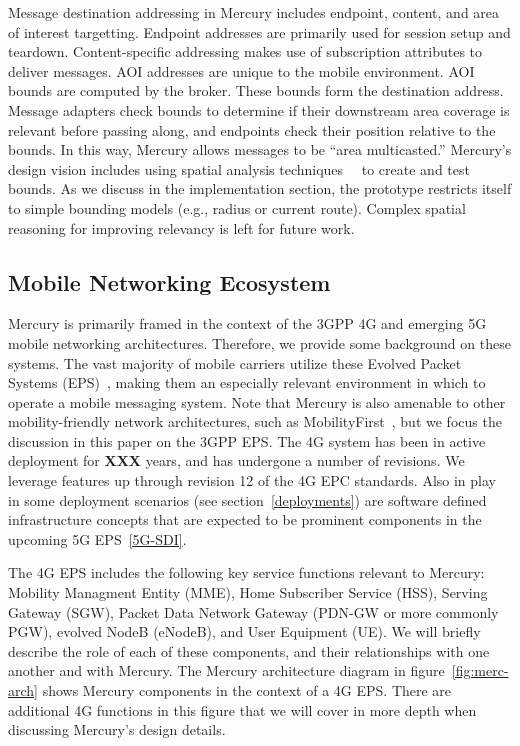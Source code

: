 Message destination addressing in Mercury includes endpoint, content,
and area of interest targetting. Endpoint addresses are primarily used
for session setup and teardown. Content-specific addressing makes use
of subscription attributes to deliver messages. AOI addresses are
unique to the mobile environment. AOI bounds are computed by the
broker. These bounds form the destination address. Message adapters
check bounds to determine if their downstream area coverage is
relevant before passing along, and endpoints check their position
relative to the bounds.  In this way, Mercury allows messages to be
``area multicasted.''  Mercury's design vision includes using spatial
analysis techniques~\cite{sp-an1}~\cite{sp-an2} to create and test
bounds.  As we discuss in the implementation section, the prototype
restricts itself to simple bounding models (e.g., radius or current
route). Complex spatial reasoning for improving relevancy is left for
future work.

\subsection{Mobile Networking Ecosystem}

Mercury is primarily framed in the context of the 3GPP 4G and emerging
5G mobile networking architectures. Therefore, we provide some
background on these systems.  The vast majority of mobile carriers
utilize these Evolved Packet Systems (EPS)~\cite{mobile-stats}, making
them an especially relevant environment in which to operate a mobile
messaging system.  Note that Mercury is also amenable to other
mobility-friendly network architectures, such as
MobilityFirst~\cite{mobility-first}, but we focus the discussion in
this paper on the 3GPP EPS.  The 4G system has been in active
deployment for {\bf XXX} years, and has undergone a number of
revisions. We leverage features up through revision 12 of the 4G EPC
standards.  Also in play in some deployment scenarios (see
section~\ref{deployments}) are software defined infrastructure
concepts that are expected to be prominent components in the upcoming
5G EPS~\ref{5G-SDI}.

The 4G EPS includes the following key service functions relevant to
Mercury: Mobility Managment Entity (MME), Home Subscriber Service
(HSS), Serving Gateway (SGW), Packet Data Network Gateway (PDN-GW or
more commonly PGW), evolved NodeB (eNodeB), and User Equipment (UE).
We will briefly describe the role of each of these components, and
their relationships with one another and with Mercury. The Mercury
architecture diagram in figure~\ref{fig:merc-arch} shows Mercury
components in the context of a 4G EPS.  There are additional 4G
functions in this figure that we will cover in more depth when
discussing Mercury's design details.

